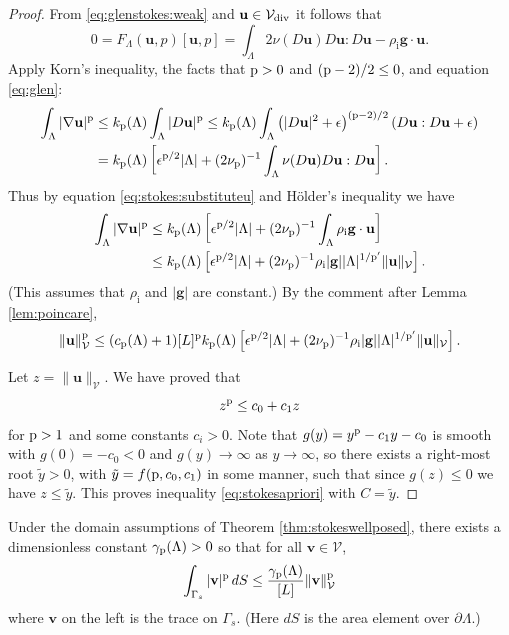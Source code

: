 \documentclass[hidelinks,onefignum,onetabnum,final]{siamart220329}  %
\newcommand{\eps}{\epsilon}
\newcommand{\grad}{\nabla}
\newcommand{\bg}{\mathbf{g}}
\newcommand{\bu}{\mathbf{u}}
\newcommand{\bv}{\mathbf{v}}
\newcommand{\cV}{\mathcal{V}}
\newcommand{\pp}{{\text{\textnormal{p}}}}
\newcommand{\rhoi}{\rho_{\text{i}}}
\newcommand{\Vdiv}{\cV_{\text{\textnormal{div}}}}
\begin{document}
\begin{proof}
From \eqref{eq:glenstokes:weak} and $\bu \in\Vdiv$ it follows that
\begin{equation}
0= F_\Lambda(\bu,p)[\bu,p] = \int_\Lambda 2 \nu(D\bu) D\bu : D\bu - \rhoi \bg \cdot \bu.  \label{eq:stokes:substituteu}
\end{equation}
Apply Korn's inequality, the facts that $\pp>0$ and $(\pp-2)/2 \le 0$, and equation \eqref{eq:glen}:
\begin{align}
\int_\Lambda |\grad\bu|^\pp &\le k_{\pp}(\Lambda) \int_\Lambda |D\bu|^\pp \le k_{\pp}(\Lambda) \int_\Lambda \left(|D\bu|^2 + \eps\right)^{(\pp-2)/2} \left(D\bu:D\bu + \eps\right) \label{eq:stokes:startapriori} \\
	&= k_{\pp}(\Lambda) \left[\eps^{\pp/2} |\Lambda| + (2 \nu_\pp)^{-1} \int_\Lambda \nu(D\bu) D\bu:D\bu\right]. \notag
\end{align}
Thus by equation \eqref{eq:stokes:substituteu} and H\"older's inequality we have
\begin{align}
\int_\Lambda |\grad\bu|^\pp &\le k_{\pp}(\Lambda) \left[\eps^{\pp/2} |\Lambda| + (2 \nu_\pp)^{-1} \int_\Lambda \rhoi \bg \cdot \bu\right] \label{eq:stokes:workapriori} \\
	&\le k_{\pp}(\Lambda) \left[\eps^{\pp/2} |\Lambda| + (2 \nu_\pp)^{-1} \rhoi |\bg| |\Lambda|^{1/\pp'} \|\bu\|_\cV\right]. \notag
\end{align}
(This assumes that $\rhoi$ and $|\bg|$ are constant.)  By the comment after Lemma \ref{lem:poincare},
\begin{equation}
\|\bu\|_{\cV}^\pp \le (c_{\pp}(\Lambda) + 1) [L]^\pp k_{\pp}(\Lambda) \left[\eps^{\pp/2} |\Lambda| + (2 \nu_\pp)^{-1} \rhoi |\bg| |\Lambda|^{1/\pp'} \|\bu\|_\cV\right].
\end{equation}

Let $z=\|\bu\|_\cV$.  We have proved that
\begin{equation}
z^\pp \le c_0 + c_1 z
\end{equation}
for $\pp>1$ and some constants $c_i>0$.  Note that $g(y) = y^\pp - c_1 y - c_0$ is smooth with $g(0)=-c_0<0$ and $g(y) \to \infty$ as $y \to \infty$, so there exists a right-most root $\tilde y>0$, with $\tilde y = f(\pp,c_0,c_1)$ in some manner, such that since $g(z)\le 0$ we have $z \le \tilde y$.  This proves inequality \eqref{eq:stokesapriori} with $C=\tilde y$.
\end{proof}

\begin{lemma} \label{lem:trace}
Under the domain assumptions of Theorem \ref{thm:stokeswellposed}, there exists a dimensionless constant $\gamma_{\pp}(\Lambda)>0$ so that for all $\bv \in \cV$,
\begin{equation}
\int_{\Gamma_s} |\bv|^\pp \,dS \le \frac{\gamma_{\pp}(\Lambda)}{[L]} \|\bv\|_{\cV}^\pp \label{eq:trace}
\end{equation}
where $\bv$ on the left is the trace on $\Gamma_s$.  (Here $dS$ is the area element over $\partial\Lambda$.)
\end{lemma}
\end{document}
